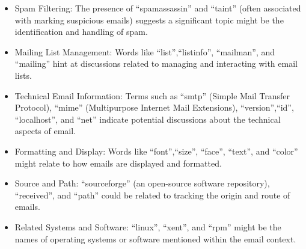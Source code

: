 \begin{itemize}
    \item Spam Filtering: The presence of ``spamassassin'' and ``taint'' (often associated with marking suspicious emails) suggests a significant topic might be the identification and handling of spam.
    \item Mailing List Management: Words like ``list'',``listinfo'', ``mailman'', and ``mailing'' hint at discussions related to managing and interacting with email lists.
    \item Technical Email Information: Terms such as ``smtp'' (Simple Mail Transfer Protocol), ``mime'' (Multipurpose Internet Mail Extensions), ``version'',``id'', ``localhost'', and ``net'' indicate potential discussions about the technical aspects of email.
    \item Formatting and Display: Words like ``font'',``size'', ``face'', ``text'', and ``color'' might relate to how emails are displayed and formatted.
    \item Source and Path: ``sourceforge'' (an open-source software repository), ``received'', and ``path'' could be related to tracking the origin and route of emails.
    \item Related Systems and Software: ``linux'', ``xent'', and ``rpm'' might be the names of operating systems or software mentioned within the email context.
\end{itemize}